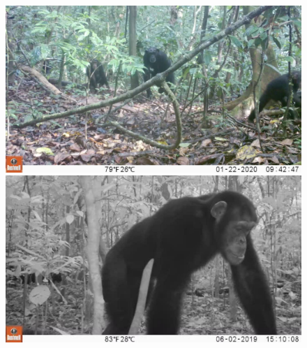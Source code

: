 \begin{figure}[htbp]
    \centering
    \begin{minipage}[t]{0.48\textwidth}
        \centering
        \includegraphics[width=\linewidth]{body/experimental/assets/detection_frames/frame1}
    \end{minipage}
    \begin{minipage}[t]{0.48\textwidth}
        \centering
        \includegraphics[width=\linewidth]{body/experimental/assets/detection_frames/frame2}
    \end{minipage}


\end{figure}
